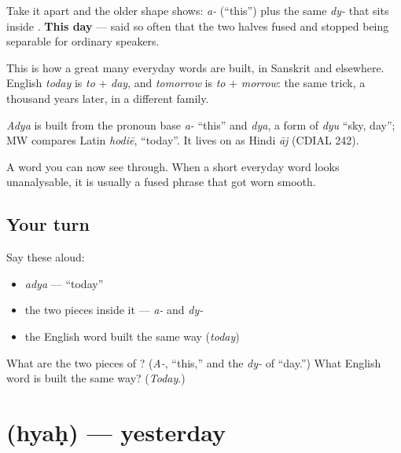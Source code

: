 Take it apart and the older shape shows: \emph{a-} (\textquotedblleft{}this\textquotedblright{}) plus the same \emph{dy-} that sits inside . \textbf{This day} — said so often that the two halves fused and stopped being separable for ordinary speakers.

This is how a great many everyday words are built, in Sanskrit and elsewhere. English \emph{today} is \emph{to} + \emph{day}, and \emph{tomorrow} is \emph{to} + \emph{morrow}: the same trick, a thousand years later, in a different family.

\begin{cousinweb}
\emph{Adya} is built from the pronoun base \emph{a-} \textquotedblleft{}this\textquotedblright{} and \emph{dya}, a form of \emph{dyu} \textquotedblleft{}sky, day\textquotedblright{}; MW compares Latin \emph{hodiē}, \textquotedblleft{}today\textquotedblright{}. It lives on as Hindi \emph{āj} (CDIAL 242).
\end{cousinweb}

\begin{grammarlens}[title={What you've built}]
A word you can now see through. When a short everyday word looks unanalysable, it is usually a fused phrase that got worn smooth.
\end{grammarlens}

\subsection*{Your turn}
Say these aloud:

\begin{itemize}
\raggedright
  \item \emph{adya} — \textquotedblleft{}today\textquotedblright{}
  \item the two pieces inside it — \emph{a-} and \emph{dy-}
  \item the English word built the same way (\emph{today})
\end{itemize}

\begin{tcolorbox}[breakable,colback=teal!4,colframe=teal!35!black,title={Before you move on}]
What are the two pieces of ? (\emph{A-}, \textquotedblleft{}this,\textquotedblright{} and the \emph{dy-} of \textquotedblleft{}day.\textquotedblright{}) What English word is built the same way? (\emph{Today}.)
\end{tcolorbox}
\section[\texorpdfstring{\sk{ह्यः} (hyaḥ)}{ह्यः (hyaḥ)}]{ (hyaḥ) — yesterday}

